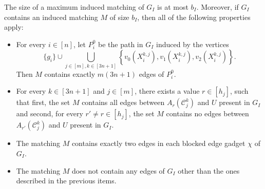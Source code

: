 \documentclass[a4paper,UKenglish,cleveref, autoref, thm-restate]{lipics-v2021}
\begin{document}
\begin{lemma}\label{mim::lem:form-of-solution}
    The size of a maximum induced matching of $G_I$ is at most $b_I$. Moreover, if $G_I$ contains an induced matching $M$ of size $b_I$, then all of the following properties apply:
    \begin{itemize}
        \item For every $i \in [n]$, 
        let $P_i^0$ be the path in $G_I$ induced by the vertices 
        \[
         \{g_i\} \cup \bigcup_{j \in [m], k \in [3n+1]} \left\{v_0(X_i^{k,j}), v_1(X_i^{k,j}), v_2(X_i^{k,j})\right\}.
        \] 
        Then $M$ contains exactly $m(3n+1)$ edges of $P_i^0$.
        \item For every $k \in [3n+1]$ and $j \in [m]$, there exists a value $r\in[h_j]$, such that first, the set $M$ contains all edges between $A_r(\mathscr{C}_j^k)$ and $U$ present in $G_I$ and second, for every $r' \neq r \in [h_j]$, the set $M$ contains no edges between $A_{r'}(\mathscr{C}_j^k)$ and $U$ present in $G_I$.
        \item The matching $M$ contains exactly two edges in each blocked edge gadget $\chi$ of $G_I$.
        \item The matching $M$ does not contain any edges of $G_I$ other than the ones described in the previous items.
    \end{itemize}
\end{lemma}
\end{document}
